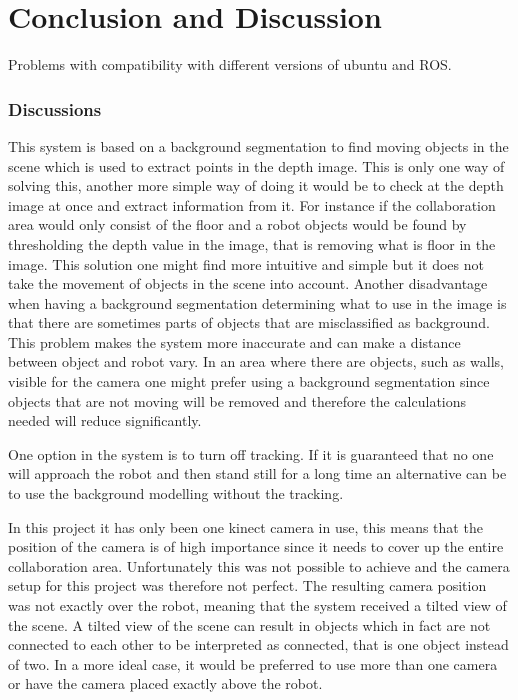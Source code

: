 \section{Conclusion and Discussion}
Problems with compatibility with different versions of ubuntu and ROS.  

\subsubsection{Discussions}
This system is based on a background segmentation to find moving objects in the scene which is used to extract points in the depth image. This is only one way of solving this, another more simple way of doing it would be to check at the depth image at once and extract information from it. For instance if the collaboration area would only consist of the floor and a robot objects would be found by thresholding the depth value in the image, that is removing what is floor in the image. This solution one might find more intuitive and simple but it does not take the movement of objects in the scene into account. Another disadvantage when having a background segmentation determining what to use in the image is that there are sometimes parts of objects that are misclassified as background. This problem makes the system more inaccurate and can make a distance between object and robot vary. In an area where there are objects, such as walls, visible for the camera one might prefer using a background segmentation since objects that are not moving will be removed and therefore the calculations needed will reduce significantly.  

One option in the system is to turn off tracking. If it is guaranteed that no one will approach the robot and then stand still for a long time an alternative can be to use the background modelling without the tracking.

In this project it has only been one kinect camera in use, this means that the position of the camera is of high importance since it needs to cover up the entire collaboration area. Unfortunately this was not possible to achieve and the camera setup for this project was therefore not perfect. The resulting camera position was not exactly over the robot, meaning that the system received a tilted view of the scene. A tilted view of the scene can result in objects which in fact are not connected to each other to be interpreted as connected, that is one object instead of two. In a more ideal case, it would be preferred to use more than one camera or have the camera placed exactly above the robot. 

